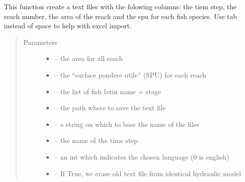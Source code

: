 \documentclass[letterpaper,10pt,english]{sphinxmanual}
\begin{document}
\begin{fulllineitems}
\label{\detokenize{index:src.calcul_hab.save_spu_txt}}
This function create a text files with the folowing columns: the tiem step, the reach number, the area of the
reach and the spu for each fish species. Use tab instead of space to help with excel import.
\begin{quote}\begin{description}
\item[{Parameters}] \leavevmode\begin{itemize}
\item {} 
 -- the area for all reach

\item {} 
 -- the ``surface pondere utile'' (SPU) for each reach

\item {} 
 -- the list of fish latin name + stage

\item {} 
 -- the path where to save the text file

\item {} 
 -- a string on which to base the name of the files

\item {} 
 -- the name of the time step

\item {} 
 -- an int which indicates the chosen language (0 is english)

\item {} 
 -- If True, we erase old text file from identical hydraulic model

\end{itemize}

\end{description}\end{quote}

\end{fulllineitems}

\end{document}
